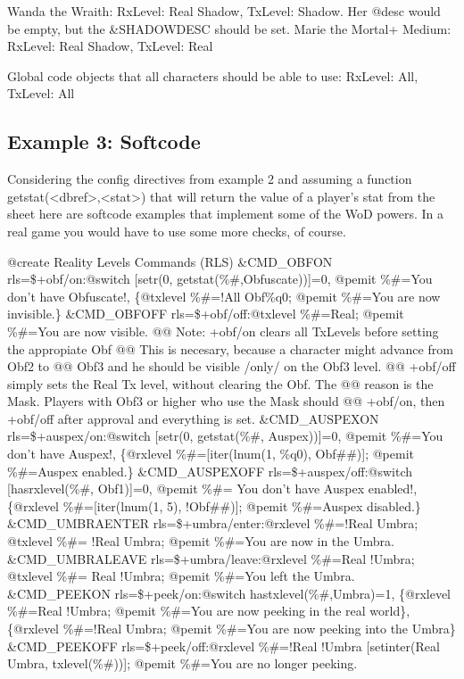 \documentclass[letterpaper,10pt,english]{sphinxmanual}
\begin{document}
\sphinxAtStartPar
Wanda the Wraith: RxLevel: Real Shadow, TxLevel: Shadow. Her @desc
would be empty, but the \&SHADOWDESC should be set.
Marie the Mortal+ Medium: RxLevel: Real Shadow, TxLevel: Real

\sphinxAtStartPar
Global code objects that all characters should be able to use:
RxLevel: All, TxLevel: All


\subsection{Example 3: Softcode}
\label{\detokenize{advanced:example-3-softcode}}
\sphinxAtStartPar
Considering the config directives from example 2 and assuming a function
getstat(\textless{}dbref\textgreater{},\textless{}stat\textgreater{}) that will return the value of a player’s stat from
the sheet here are softcode examples that implement some of the WoD powers.
In a real game you would have to use some more checks, of course.

\sphinxAtStartPar
@create Reality Levels Commands (RLS)
\&CMD\_OBFON rls=\$+obf/on:@switch {[}setr(0, getstat(\%\#,Obfuscate)){]}=0, @pemit
\%\#=You don’t have Obfuscate!, \{@txlevel \%\#=!All Obf\%q0; @pemit \%\#=You are
now invisible.\}
\&CMD\_OBFOFF rls=\$+obf/off:@txlevel \%\#=Real; @pemit \%\#=You are now visible.
@@ Note: +obf/on clears all TxLevels before setting the appropiate Obf
@@ This is necesary, because a character might advance from Obf2 to
@@ Obf3 and he should be visible /only/ on the Obf3 level.
@@ +obf/off simply sets the Real Tx level, without clearing the Obf. The
@@ reason is the Mask. Players with Obf3 or higher who use the Mask should
@@ +obf/on, then +obf/off after approval and everything is set.
\&CMD\_AUSPEXON rls=\$+auspex/on:@switch {[}setr(0, getstat(\%\#, Auspex)){]}=0,
@pemit \%\#=You don’t have Auspex!, \{@rxlevel \%\#={[}iter(lnum(1, \%q0), Obf\#\#){]};
@pemit \%\#=Auspex enabled.\}
\&CMD\_AUSPEXOFF rls=\$+auspex/off:@switch {[}hasrxlevel(\%\#, Obf1){]}=0, @pemit \%\#=
You don’t have Auspex enabled!, \{@rxlevel \%\#={[}iter(lnum(1, 5), !Obf\#\#){]};
@pemit \%\#=Auspex disabled.\}
\&CMD\_UMBRAENTER rls=\$+umbra/enter:@rxlevel \%\#=!Real Umbra; @txlevel \%\#=
!Real Umbra; @pemit \%\#=You are now in the Umbra.
\&CMD\_UMBRALEAVE rls=\$+umbra/leave:@rxlevel \%\#=Real !Umbra; @txlevel \%\#=
Real !Umbra; @pemit \%\#=You left the Umbra.
\&CMD\_PEEKON rls=\$+peek/on:@switch hastxlevel(\%\#,Umbra)=1, \{@rxlevel \%\#=Real
!Umbra; @pemit \%\#=You are now peeking in the real world\}, \{@rxlevel \%\#=!Real
Umbra; @pemit \%\#=You are now peeking into the Umbra\}
\&CMD\_PEEKOFF rls=\$+peek/off:@rxlevel \%\#=!Real !Umbra {[}setinter(Real Umbra,
txlevel(\%\#)){]}; @pemit \%\#=You are no longer peeking.
\end{document}
